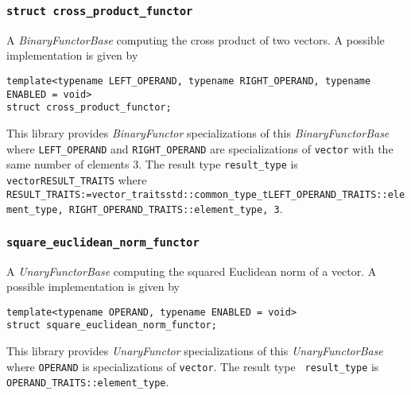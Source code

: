 \documentclass[oneside]{book}
\begin{document}
\subsubsection{\texttt{struct cross\_product\_functor}}
A \textit{BinaryFunctorBase} computing the cross product of two vectors.
A possible implementation is given by
\begin{verbatim}
template<typename LEFT_OPERAND, typename RIGHT_OPERAND, typename ENABLED = void>
struct cross_product_functor;
\end{verbatim}

This library provides \textit{BinaryFunctor} specializations of this \textit{BinaryFunctorBase}
where \texttt{LEFT\_OPERAND} and \texttt{RIGHT\_OPERAND} are specializations of \texttt{vector} with   the
same number of elements $3$. The result type \texttt{result\_type} is  \texttt{vector\textlangle RESULT\_TRAITS\textrangle}
where\newline
\texttt{
RESULT\_TRAITS:=vector\_traits\textlangle std::common\_type\_t\textlangle{}LEFT\_OPERAND\_TRAITS::element\_type,\newline%
\hphantom{RESULT\_TRAITS:=vector\_traits\textlangle std::common\_type\_t\textlangle}RIGHT\_OPERAND\_TRAITS::element\_type\textrangle,\newline%
\hphantom{RESULT\_TRAITS:=vector\_traits\textlangle}3\textrangle}.

\subsubsection{\texttt{square\_euclidean\_norm\_functor}}
A \textit{UnaryFunctorBase} computing the squared Euclidean norm of a vector.
A possible implementation is given by
\begin{verbatim}
template<typename OPERAND, typename ENABLED = void>
struct square_euclidean_norm_functor;
\end{verbatim}

This library provides \textit{UnaryFunctor} specializations of this \textit{UnaryFunctorBase}
where \texttt{OPERAND} is specializations of \texttt{vector}. The result type        \texttt{
result\_type} is \texttt{OPERAND\_TRAITS::element\_type\textrangle}.

\end{document}
